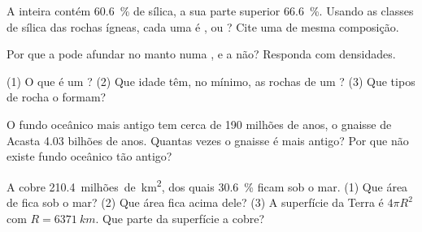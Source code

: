 \begin{exercise}[$\star$]\label{exo:g12:continental-crust:2}
A  inteira contém \qty{60.6}{\percent} de sílica, a sua
parte superior \qty{66.6}{\percent}. Usando as classes de sílica das rochas
ígneas, cada uma é ,  ou ? Cite uma  de mesma composição.
\end{exercise}

\begin{exercise}[$\star$]\label{exo:g12:continental-crust:3}
Por que a  pode afundar no manto numa , e a
 não? Responda com densidades.
\end{exercise}

\begin{exercise}[$\star$]\label{exo:g12:continental-crust:4}
(1) O que é um ? (2) Que idade têm, no mínimo, as rochas de um ?
(3) Que tipos de rocha o formam?
\end{exercise}

\begin{exercise}[$\star$]\label{exo:g12:continental-crust:5}
O fundo oceânico mais antigo tem cerca de 190 milhões de anos, o gnaisse de
Acasta 4.03 bilhões de anos. Quantas vezes o gnaisse é mais antigo? Por que
não existe fundo oceânico tão antigo?
\end{exercise}

\begin{exercise}[$\star\star$]\label{exo:g12:continental-crust:6}
A  cobre \num{210.4}~milhões~de~\unit{km^2}, dos quais
\qty{30.6}{\percent} ficam sob o mar. (1) Que área de 
fica sob o mar? (2) Que área fica acima dele? (3) A superfície da Terra é
$4\pi R^2$ com $R = \qty{6371}{km}$. Que parte da superfície a  cobre?
\end{exercise}


